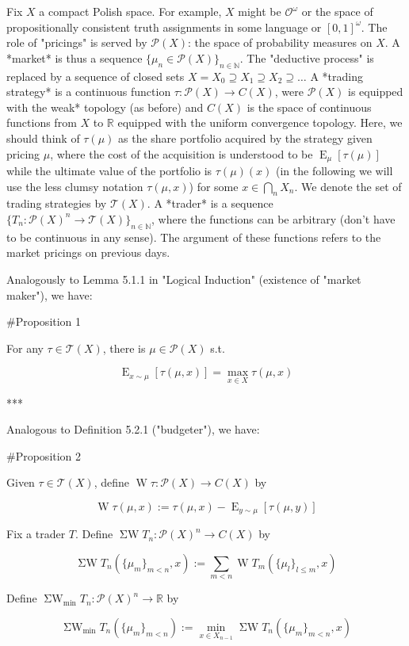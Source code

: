 \documentclass[a4paper]{article}
\DeclareMathOperator{\E}{E}
\newcommand{\Nats}{\mathbb{N}}
\newcommand{\Reals}{\mathbb{R}}
\newcommand{\Prob}{\mathcal{P}}
\newcommand{\T}{\mathcal{T}(X)}
\newcommand{\W}{\operatorname{W}}
\newcommand{\SW}{\operatorname{\Sigma W}}
\newcommand{\SWm}{\operatorname{\Sigma W}_{\min}}
\begin{document}
Fix ${X}$ a compact Polish space. For example, ${X}$ might be ${\mathcal{O}^\omega}$ or the space of propositionally consistent truth assignments in some language or ${[0,1]^\omega}$. The role of "pricings" is served by ${\Prob(X)}$: the space of probability measures on ${X}$. A *market* is thus a sequence ${\{\mu_n \in \Prob(X)\}_{n \in \Nats}}$. The "deductive process" is replaced by a sequence of closed sets ${X = X_0 \supseteq X_1 \supseteq X_2 \supseteq \ldots}$ A *trading strategy* is a continuous function ${\tau: \Prob(X) \rightarrow C(X)}$, were ${\Prob(X)}$ is equipped with the weak* topology (as before) and ${C(X)}$ is the space of continuous functions from ${X}$ to ${\Reals}$ equipped with the uniform convergence topology. Here, we should think of ${\tau(\mu)}$ as the share portfolio acquired by the strategy given pricing ${\mu}$, where the cost of the acquisition is understood to be ${\E_\mu[\tau(\mu)]}$ while the ultimate value of the portfolio is ${\tau(\mu)(x)}$ (in the following we will use the less clumsy notation ${\tau(\mu,x)}$) for some ${x \in \bigcap_n X_n}$. We denote the set of trading strategies by ${\T}$. A *trader* is a sequence ${\{T_n: \Prob(X)^n \rightarrow \T\}_{n \in \Nats}}$, where the functions can be arbitrary (don't have to be continuous in any sense). The argument of these functions refers to the market pricings on previous days.

Analogously to Lemma 5.1.1 in "Logical Induction" (existence of "market maker"), we have:

\#Proposition 1

For any ${\tau \in \T}$, there is ${\mu \in \Prob(X)}$ s.t.

$$\E_{x \sim \mu}[\tau(\mu,x)] = \max_{x \in X} \tau(\mu,x)$$

***

Analogous to Definition 5.2.1 ("budgeter"), we have:

\#Proposition 2

Given ${\tau \in \T}$, define ${\W\tau: \Prob(X) \rightarrow C(X)}$ by

$$\W\tau(\mu,x):=\tau(\mu,x)-\E_{y \sim \mu}[\tau(\mu,y)]$$

Fix a trader ${T}$. Define ${\SW T_n: \Prob(X)^n \rightarrow C(X)}$ by

$$\SW T_n(\{\mu_m\}_{m < n}, x):=\sum_{m<n} \W T_m(\{\mu_l\}_{l \leq m},x)$$

Define ${\SWm T_n: \Prob(X)^n \rightarrow \Reals}$ by

$$\SWm T_n(\{\mu_m\}_{m < n}):=\min_{x \in X_{n-1}} \SW T_n(\{\mu_m\}_{m < n}, x)$$
\end{document}
